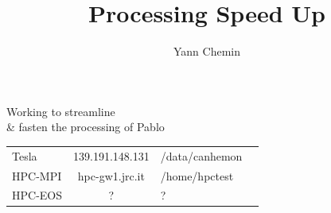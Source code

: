 \documentclass[serif,mathserif,aspectratio=169]{beamer}
\title[JRC\hspace{2em}\insertframenumber/\inserttotalframenumber]{Processing Speed Up}
\author[Yann Chemin]{Yann Chemin }
\institute{JRC}
\date{} %
\begin{document}
{
\begin{frame}[plain]
\titlepage
\end{frame}}

\Large


\begin{frame}
  
  Working to streamline \\\& fasten the processing of Pablo\\
  
\begin{table}
\begin{tabular}{lclc}
 Tesla & 139.191.148.131 & /data/canhemon\pause\\
 HPC-MPI & hpc-gw1.jrc.it & /home/hpctest\pause\\
 HPC-EOS & ? & ?\\
 \end{tabular}
\end{table}

\end{frame}

\end{document}
